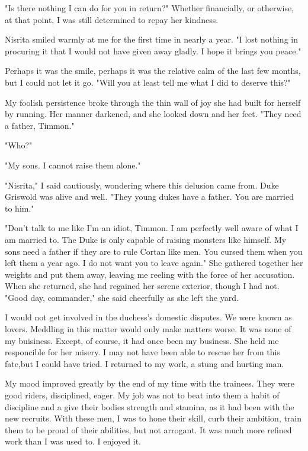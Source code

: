 \documentclass{article}
\begin{document}
"Is there nothing I can do for you in return?" Whether financially, or otherwise, at that point, I was still determined to repay her kindness.

Nisrita smiled warmly at me for the first time in nearly a year. "I lost nothing in procuring it that I would not have given away gladly. I hope it brings you peace."

Perhaps it was the smile, perhaps it was the relative calm of the last few months, but I could not let it go. "Will you at least tell me what I did to deserve this?"

My foolish persistence broke through the thin wall of joy she had built for herself by running. Her manner darkened, and she looked down and her feet. "They need a father, Timmon."

"Who?"

"My sons. I cannot raise them alone."

"Nisrita," I said cautiously, wondering where this delusion came from. Duke Griswold was alive and well. "They young dukes have a father. You are married to him."

"Don't talk to me like I'm an idiot, Timmon. I am perfectly well aware of what I am married to. The Duke is only capable of raising monsters like himself. My sons need a father if they are to rule Cortan like men. You cursed them when you left them a year ago. I do not want you to leave again." She gathered together her weights and put them away, leaving me reeling with the force of her accusation. When she returned, she had regained her serene exterior, though I had not. "Good day, commander," she said cheerfully as she left the yard.

I would not get involved in the duchess's domestic disputes. We were known as lovers. Meddling in this matter would only make matters worse. It was none of my buisiness. Except, of course, it had once been my business. She held me responcible for her misery. I may not have been able to rescue her from this fate,but I could have tried. I returned to my work, a stung and hurting man.

My mood improved greatly by the end of my time with the trainees. They were good riders, disciplined, eager. My job was not to beat into them a habit of discipline and a give their bodies strength and stamina, as it had been with the new recruits. With these men, I was to hone their skill, curb their ambition, train them to be proud of their abilities, but not arrogant. It was much more refined work than I was used to. I enjoyed it.
\end{document}
